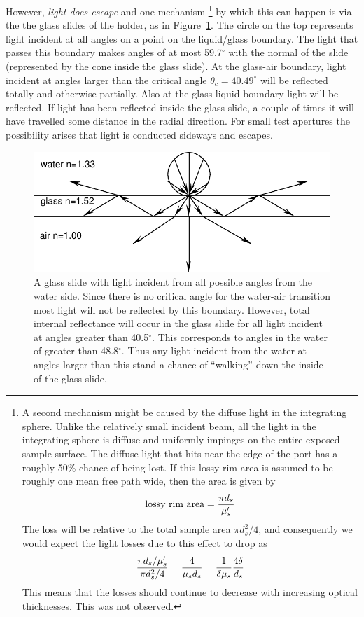 \documentclass{article}
\begin{document}
However, \textit{light does escape} and one mechanism%
\footnote{A second mechanism might be caused by  the diffuse light in the integrating sphere.  Unlike the
relatively small incident beam, all the light in the integrating sphere
is diffuse and uniformly impinges on the entire exposed sample surface.
The diffuse light that hits near the edge of the port has a roughly
50\% chance of being lost.  If this lossy rim area is assumed to be 
roughly one mean free path wide, then the area is given by
$$
\mbox{lossy rim area} = {\pi d_s \over \mu_s'}
$$
The loss will be relative to the total sample area $\pi d_s^2/4$, and
consequently we would expect the light losses due to this effect to 
drop as
$$
{ \pi d_s / \mu_s' \over \pi d_s^2/4} = {4\over \mu_s d_s} = {1\over \delta \mu_s} {4 \delta \over d_s}
$$
This means that the losses should continue to decrease with increasing
optical thicknesses.  This was not observed.}
by which this can happen is
via the the glass slides of the holder, as in Figure~\ref{glass-slide}.  The circle on the top represents light incident at
all angles on a point on the liquid/glass boundary.  The light that
passes this boundary makes angles of at most 59.7$^\circ$ with the
normal of the slide (represented by the cone inside the glass slide). 
At the glass-air boundary, light incident at angles larger than the
critical angle $\theta_c=40.49^\circ$ will be reflected totally and 
otherwise partially.  Also at the glass-liquid boundary light will be
reflected.  If light has been reflected inside the glass slide, a
couple of times it will have travelled some distance in the radial
direction.  For small test apertures the possibility arises that light
is conducted sideways and escapes.  

\begin{figure}[tp]
\includegraphics[scale=0.945]{glass-slide.pdf}
\caption{A glass slide with light incident from all possible angles from
the water side.  Since there is no critical angle for the water-air transition
most light will not be reflected by this boundary.  However, total internal
reflectance will occur in the glass slide for all light incident at angles 
greater than 40.5$^\circ$.  This corresponds to angles in the water of greater
than 48.8$^\circ$.  Thus any light incident from the water at angles larger
than this stand a chance of ``walking'' down the inside of the glass slide.}
\label{glass-slide}
\end{figure}
\end{document}
